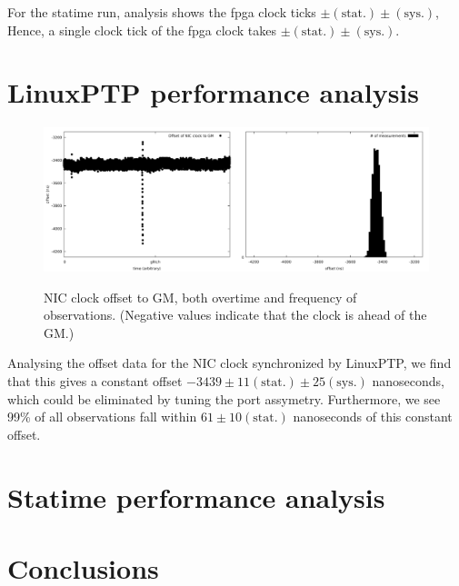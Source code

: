 \documentclass{article}
\begin{document}
For the statime run, analysis shows the fpga clock ticks $ \pm (\text{stat.}) \pm (\text{sys.})$, Hence, a single clock tick of the fpga clock takes $ \pm (\text{stat.}) \pm (\text{sys.})$.

\section {LinuxPTP performance analysis}

\begin{figure}[h]
\includegraphics[width=0.5\textwidth]{gm_ref_offset_overtime.pdf}\includegraphics[width=0.5\textwidth]{gm_ref_offset.pdf}
\caption{NIC clock offset to GM, both overtime and frequency of observations. (Negative values indicate that the clock is ahead of the GM.)}
\label{fig:ref_nic_offset}
\end{figure}

Analysing the offset data for the NIC clock synchronized by LinuxPTP, we find that this gives a constant offset $-3439\pm 11 (\text{stat.}) \pm 25(\text{sys.})$ nanoseconds, which could be eliminated by tuning the port assymetry. Furthermore, we see 99\% of all observations fall within $61 \pm 10 (\text{stat.})$ nanoseconds of this constant offset.

\section{Statime performance analysis}

\section{Conclusions}
\end{document}
